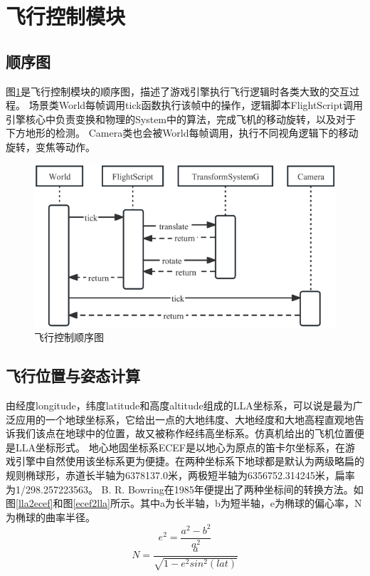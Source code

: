\section{飞行控制模块}
\subsection{顺序图}
图\ref{seq4}是飞行控制模块的顺序图，描述了游戏引擎执行飞行逻辑时各类大致的交互过程。
场景类World每帧调用tick函数执行该帧中的操作，逻辑脚本FlightScript调用引擎核心中负责变换和物理的System中的算法，完成飞机的移动旋转，以及对于下方地形的检测。
Camera类也会被World每帧调用，执行不同视角逻辑下的移动旋转，变焦等动作。
\begin{figure}[h!]
    \begin{center}
        \includegraphics[width=.8\textwidth]{pictures/sequence4.pdf}
        \caption{飞行控制顺序图}
        \label{seq4}
    \end{center}
\end{figure}
\subsection{飞行位置与姿态计算}
由经度longitude，纬度latitude和高度altitude组成的LLA坐标系，可以说是最为广泛应用的一个地球坐标系，它给出一点的大地纬度、大地经度和大地高程直观地告诉我们该点在地球中的位置，故又被称作经纬高坐标系。仿真机给出的飞机位置便是LLA坐标形式。
地心地固坐标系ECEF是以地心为原点的笛卡尔坐标系，在游戏引擎中自然使用该坐标系更为便捷。在两种坐标系下地球都是默认为两级略扁的规则椭球形，赤道长半轴为6378137.0米，两极短半轴为6356752.314245米，扁率为1/298.257223563。
B. R. Bowring在1985年便提出了两种坐标间的转换方法\cite{cha4}。如图\ref{lla2ecef}和图\ref{ecef2lla}所示。其中a为长半轴，b为短半轴，e为椭球的偏心率，N为椭球的曲率半径。
$$e^2=\frac{a^2-b^2}{a^2}$$
$$N=\frac{a}{\sqrt{1-e^2sin^2(lat)}}$$

